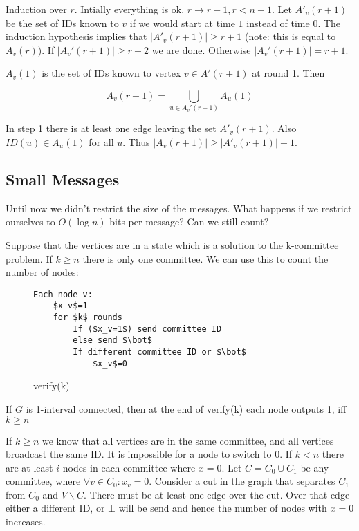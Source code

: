 \begin{pr} Induction over $r$. Intially everything is ok. $r\rightarrow r+1, r<n-1$. Let $A'_v(r+1)$ be the set of IDs known to $v$ if we would start at time $1$ instead of time 0. The induction hypothesis implies that $|A'_v(r+1)|\geq r+1$ (note: this is equal to $A_v(r)$). If $|A_v'(r+1)|\geq r+2$ we are done. Otherwise $|A_v'(r+1)|=r+1$. 

$A_v(1)$ is the set of IDs known to vertex $v \in A'(r+1)$ at round 1. Then

\[A_v(r+1)=\bigcup_{u\in A_v'(r+1)} A_u(1)\]

In step 1 there is at least one edge leaving the set $A'_v(r+1)$. Also $ID(u)\in A_u(1)$ for all $u$. Thus $|A_v(r+1)|\geq |A'_v(r+1)|+1$.
\end{pr}

\subsection{Small Messages}

Until now we didn't restrict the size of the messages. What happens if we restrict ourselves to $O(\log n)$ bits per message? Can we still count?

Suppose that the vertices are in a state which is a solution to the k-committee problem. If $k\geq n$ there is only one committee. We can use this to count the number of nodes:

\begin{figure}[hbt]
\begin{lstlisting}
Each node v:
	$x_v$=1
	for $k$ rounds
		If ($x_v=1$) send committee ID
		else send $\bot$
		If different committee ID or $\bot$
			$x_v$=0
\end{lstlisting}
\caption{verify(k)}
\end{figure}

\begin{lem} If $G$ is 1-interval connected, then at the end of verify(k) each node outputs 1, iff $k\geq n$\end{lem}
\begin{pr} If $k\geq n$ we know that all vertices are in the same committee, and all vertices broadcast the same ID. It is impossible for a node to switch to $0$. If $k<n$ there are at least $i$ nodes in each committee where $x=0$. Let $C = C_0 \dot \cup C_1$ be any committee, where $\forall v\in C_0: x_v=0$. Consider a cut in the graph that separates $C_1$ from $C_0$ and $V\backslash C$. There must be at least one edge over the cut. Over that edge either a different ID, or $\bot$ will be send and hence the number of nodes with $x=0$ increases.
\end{pr}

